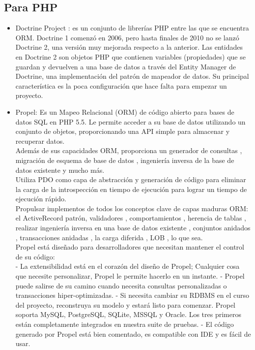 \documentclass[%
 reprint,
 amsmath,amssymb,
 aps,
]{revtex4-1}
\begin{document}
\subsection{Para PHP}
\begin{itemize}
	\item Doctrine Project : es un conjunto de librerías PHP entre las que se encuentra ORM. Doctrine 1 comenzó en 2006, pero hasta finales de 2010 no se lanzó Doctrine 2, una versión muy mejorada respecto a la anterior. Las entidades en Doctrine 2 son objetos PHP que contienen variables (propiedades) que se guardan y devuelven a una base de datos a través del Entity Manager de Doctrine, una implementación del patrón de mapeador de datos. Su principal característica es la poca configuración que hace falta para empezar un proyecto.\cite{doct}\\
	\item Propel: Es un Mapeo Relacional (ORM) de código abierto para bases de datos SQL en PHP 5.5. Le permite acceder a su base de datos utilizando un conjunto de objetos, proporcionando una API simple para almacenar y recuperar datos.\\
Además de sus capacidades ORM, proporciona un generador de consultas , migración de esquema de base de datos , ingeniería inversa de la base de datos existente y mucho más.\\
Utiliza PDO como capa de abstracción y generación de código para eliminar la carga de la introspección en tiempo de ejecución para lograr un tiempo de ejecución rápido.\\
Propulsar implementos de todos los conceptos clave de capas maduras ORM: el ActiveRecord patrón, validadores , comportamientos , herencia de tablas , realizar ingeniería inversa en una base de datos existente , conjuntos anidados , transacciones anidadas , la carga diferida , LOB , lo que sea.\\
Propel está diseñado para desarrolladores que necesitan mantener el control de su código:\\
- La extensibilidad está en el corazón del diseño de Propel; Cualquier cosa que necesite personalizar, Propel le permite hacerlo en un instante.
- Propel puede salirse de su camino cuando necesita consultas personalizadas o transacciones hiper-optimizadas.
- Si necesita cambiar su RDBMS en el curso del proyecto, reconstruya su modelo y estará listo para comenzar. Propel soporta MySQL, PostgreSQL, SQLite, MSSQL y Oracle. Los tres primeros están completamente integrados en nuestra suite de pruebas.
- El código generado por Propel está bien comentado, es compatible con IDE y es fácil de usar.\\

\end{itemize}
\end{document}
